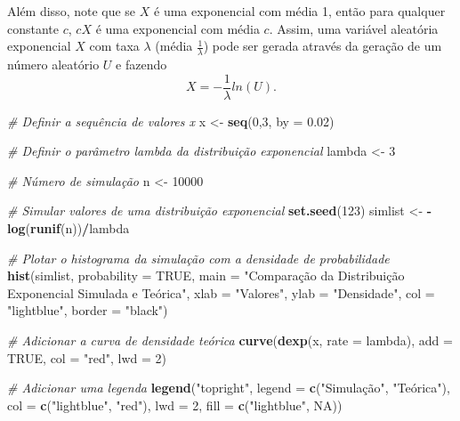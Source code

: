 \documentclass[
]{book}
\newenvironment{Shaded}{\begin{snugshade}}{\end{snugshade}}
\newcommand{\AttributeTok}[1]{\textcolor[rgb]{0.13,0.29,0.53}{#1}}
\newcommand{\CommentTok}[1]{\textcolor[rgb]{0.56,0.35,0.01}{\textit{#1}}}
\newcommand{\ConstantTok}[1]{\textcolor[rgb]{0.56,0.35,0.01}{#1}}
\newcommand{\DecValTok}[1]{\textcolor[rgb]{0.00,0.00,0.81}{#1}}
\newcommand{\FloatTok}[1]{\textcolor[rgb]{0.00,0.00,0.81}{#1}}
\newcommand{\FunctionTok}[1]{\textcolor[rgb]{0.13,0.29,0.53}{\textbf{#1}}}
\newcommand{\NormalTok}[1]{#1}
\newcommand{\OtherTok}[1]{\textcolor[rgb]{0.56,0.35,0.01}{#1}}
\newcommand{\SpecialCharTok}[1]{\textcolor[rgb]{0.81,0.36,0.00}{\textbf{#1}}}
\newcommand{\StringTok}[1]{\textcolor[rgb]{0.31,0.60,0.02}{#1}}
\begin{document}
Além disso, note que se \(X\) é uma exponencial com média 1, então para
qualquer constante \(c\), \(cX\) é uma exponencial com média \(c\). Assim, uma
variável aleatória exponencial \(X\) com taxa \(\lambda\) (média
\(\frac{1}{\lambda}\)) pode ser gerada através da geração de um número
aleatório \(U\) e fazendo \[X = -\frac{1}{\lambda}ln (U).\]

\begin{Shaded}
\begin{Highlighting}[]
\CommentTok{\# Definir a sequência de valores x}
\NormalTok{x }\OtherTok{\textless{}{-}} \FunctionTok{seq}\NormalTok{(}\DecValTok{0}\NormalTok{,}\DecValTok{3}\NormalTok{, }\AttributeTok{by =} \FloatTok{0.02}\NormalTok{)}

\CommentTok{\# Definir o parâmetro lambda da distribuição exponencial}
\NormalTok{lambda }\OtherTok{\textless{}{-}} \DecValTok{3}

\CommentTok{\# Número de simulação}
\NormalTok{n }\OtherTok{\textless{}{-}} \DecValTok{10000}

\CommentTok{\# Simular valores de uma distribuição exponencial}
\FunctionTok{set.seed}\NormalTok{(}\DecValTok{123}\NormalTok{)}
\NormalTok{simlist }\OtherTok{\textless{}{-}} \SpecialCharTok{{-}}\FunctionTok{log}\NormalTok{(}\FunctionTok{runif}\NormalTok{(n))}\SpecialCharTok{/}\NormalTok{lambda}

\CommentTok{\# Plotar o histograma da simulação com a densidade de probabilidade}
\FunctionTok{hist}\NormalTok{(simlist, }\AttributeTok{probability =} \ConstantTok{TRUE}\NormalTok{, }\AttributeTok{main =} \StringTok{"Comparação da Distribuição Exponencial Simulada e Teórica"}\NormalTok{,}
     \AttributeTok{xlab =} \StringTok{"Valores"}\NormalTok{, }\AttributeTok{ylab =} \StringTok{"Densidade"}\NormalTok{, }\AttributeTok{col =} \StringTok{"lightblue"}\NormalTok{, }\AttributeTok{border =} \StringTok{"black"}\NormalTok{)}

\CommentTok{\# Adicionar a curva de densidade teórica}
\FunctionTok{curve}\NormalTok{(}\FunctionTok{dexp}\NormalTok{(x, }\AttributeTok{rate =}\NormalTok{ lambda), }\AttributeTok{add =} \ConstantTok{TRUE}\NormalTok{, }\AttributeTok{col =} \StringTok{"red"}\NormalTok{, }\AttributeTok{lwd =} \DecValTok{2}\NormalTok{)}

\CommentTok{\# Adicionar uma legenda}
\FunctionTok{legend}\NormalTok{(}\StringTok{"topright"}\NormalTok{, }\AttributeTok{legend =} \FunctionTok{c}\NormalTok{(}\StringTok{"Simulação"}\NormalTok{, }\StringTok{"Teórica"}\NormalTok{), }\AttributeTok{col =} \FunctionTok{c}\NormalTok{(}\StringTok{"lightblue"}\NormalTok{, }\StringTok{"red"}\NormalTok{), }\AttributeTok{lwd =} \DecValTok{2}\NormalTok{, }\AttributeTok{fill =} \FunctionTok{c}\NormalTok{(}\StringTok{"lightblue"}\NormalTok{, }\ConstantTok{NA}\NormalTok{))}
\end{Highlighting}
\end{Shaded}
\end{document}
